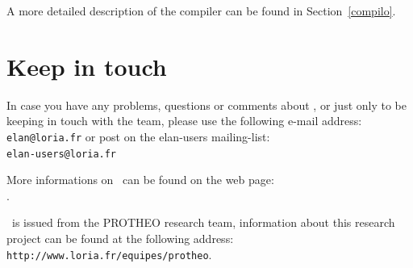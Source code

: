 \noindent
A more detailed description of the compiler can be found in
Section~\ref{compilo}. 



\section{Keep in touch}

In case you have any problems, questions or comments about \elan{}, 
or just only to be keeping in touch with the \elan{} team,
please use the following e-mail address:\\
\indent\mbox{\tt elan@loria.fr}
or post on the elan-users mailing-list:\\
\indent\mbox{\tt elan-users@loria.fr}

\noindent
More informations on \elan\ can be found on the web page:\\
\indent\localisationWebElan.

\noindent
\elan\ is issued from the PROTHEO research team, information about
this research project can be found at the following address:\\
\indent\verb|http://www.loria.fr/equipes/protheo|.

